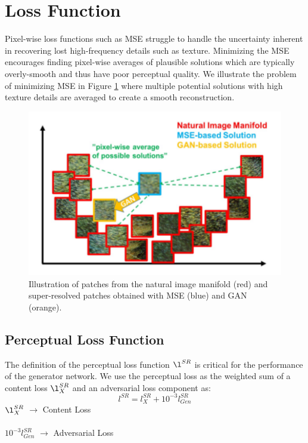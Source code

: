 \section{Loss Function}
Pixel-wise loss functions such as MSE struggle to handle
the uncertainty inherent in recovering lost high-frequency
details such as texture. Minimizing the MSE encourages finding pixel-wise averages of plausible solutions which are typically overly-smooth and thus have poor perceptual quality. We illustrate the problem of minimizing MSE in Figure \ref{mse and gan comparison} where multiple potential solutions with high texture details are averaged to create a smooth reconstruction.

\begin{figure}[h!]
\centering
\includegraphics[scale=0.5]{mse_and_gan_comparison.png}
\caption{Illustration of patches from the natural image
manifold (red) and super-resolved patches obtained with
MSE (blue) and GAN (orange). }
\label{mse and gan comparison}

\end{figure}

\subsection{Perceptual Loss Function}
The definition of the perceptual loss function $\l^{SR}$ is critical for the performance of the generator network. We use the perceptual loss as the weighted sum of a content loss $\l_X^{SR}$ and an adversarial loss component as:
\begin{equation}
l^{SR}=l_X^{SR}+10^{-3}l_{Gen}^{SR}
\end{equation}
$\l_X^{SR}$ $\rightarrow$ Content Loss\\ \\
$10^{-3}l_{Gen}^{SR}$ $\rightarrow$ Adversarial Loss\\

